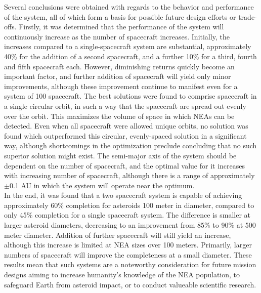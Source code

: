 Several conclusions were obtained with regards to the behavior and performance of the system, all of which form a basis for possible future design efforts or trade-offs. Firstly, it was determined that the performance of the system will continuously increase as the number of spacecraft increases. Initially, the increases compared to a single-spacecraft system are substantial, approximately 40\% for the addition of a second spacecraft, and a further 10\% for a third, fourth and fifth spacecraft each. However, diminishing returns quickly become an important factor, and further addition of spacecraft will yield only minor improvements, although these improvement continue to manifest even for a system of 100 spacecraft. The best solutions were found to comprise spacecraft in a single circular orbit, in such a way that the spacecraft are spread out evenly over the orbit. This maximizes the volume of space in which NEAs can be detected. Even when all spacecraft were allowed unique orbits, no solution was found which outperformed this circular, evenly-spaced solution in a significant way, although shortcomings in the optimization preclude concluding that no such superior solution might exist. The semi-major axis of the system should be dependent on the number of spacecraft, and the optimal value for it increases with increasing number of spacecraft, although there is a range of approximately $\pm$0.1 AU in which the system will operate near the optimum. \\

In the end, it was found that a two spacecraft system is capable of achieving approximately 60\% completion for asteroids 100 meter in diameter, compared to only 45\% completion for a single spacecraft system. The difference is smaller at larger asteroid diameters, decreasing to an improvement from 85\% to 90\% at 500 meter diameter. Addition of further spacecraft will still yield an increase, although this increase is limited at NEA sizes over 100 meters. Primarily, larger numbers of spacecraft will improve the completeness at a small diameter. These results mean that such systems are a noteworthy consideration for future mission designs aiming to increase humanity's knowledge of the NEA population, to safeguard Earth from asteroid impact, or to conduct valueable scientific research.
